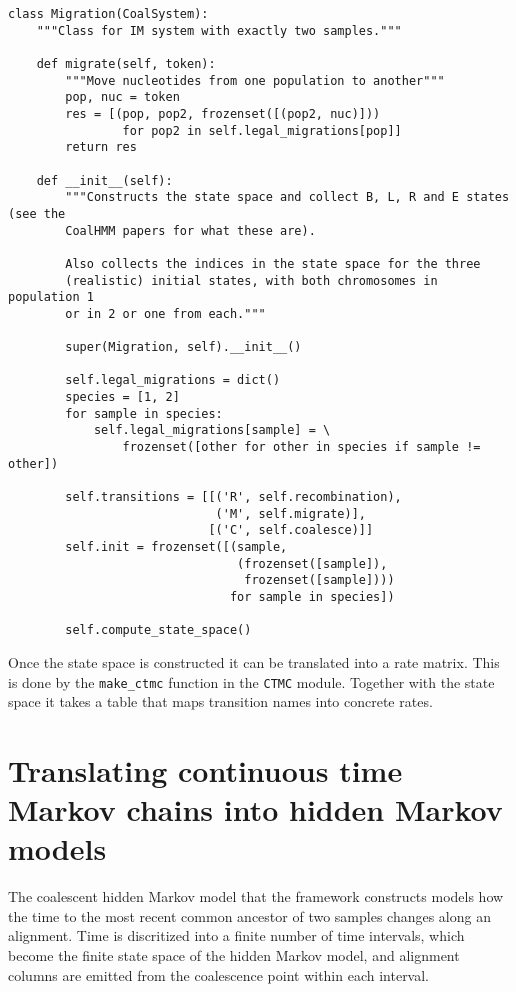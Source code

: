 \documentclass[11pt]{article}
\begin{document}
\begin{verbatim}
class Migration(CoalSystem):
    """Class for IM system with exactly two samples."""

    def migrate(self, token):
        """Move nucleotides from one population to another"""
        pop, nuc = token
        res = [(pop, pop2, frozenset([(pop2, nuc)])) 
                for pop2 in self.legal_migrations[pop]]
        return res

    def __init__(self):
        """Constructs the state space and collect B, L, R and E states (see the
        CoalHMM papers for what these are).

        Also collects the indices in the state space for the three
        (realistic) initial states, with both chromosomes in population 1
        or in 2 or one from each."""

        super(Migration, self).__init__()

        self.legal_migrations = dict()
        species = [1, 2]
        for sample in species:
            self.legal_migrations[sample] = \
                frozenset([other for other in species if sample != other])

        self.transitions = [[('R', self.recombination),
                             ('M', self.migrate)],
                            [('C', self.coalesce)]]
        self.init = frozenset([(sample,
                                (frozenset([sample]),
                                 frozenset([sample])))
                               for sample in species])

        self.compute_state_space()
\end{verbatim}


Once the state space is constructed it can be translated into a rate matrix. This is done by the \texttt{make\_ctmc} function in the \texttt{CTMC} module. Together with the state space it takes a table that maps transition names into concrete rates.



\section{Translating continuous time Markov chains into hidden Markov models}

The coalescent hidden Markov model that the framework constructs models how the time to the most recent common ancestor of two samples changes along an alignment. Time is discritized into a finite number of time intervals, which become the finite state space of the hidden Markov model, and alignment columns are emitted from the coalescence point within each interval.
\end{document}
